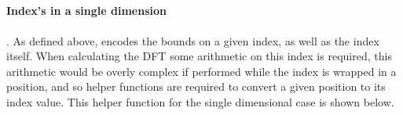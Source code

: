 \begin{code}[hide]
\AgdaSymbol{;}\AgdaSpace{}%
\AgdaSymbol{;}\AgdaSpace{}%
\AgdaSymbol{;}\AgdaSpace{}%
\AgdaSymbol{)}\<%
\\
%
\>[2]\AgdaSpace{}%
\AgdaSpace{}%
\AgdaSpace{}%
\AgdaSpace{}%
\AgdaSymbol{(}\AgdaSymbol{;}\AgdaSpace{}%
\AgdaSymbol{;}\AgdaSpace{}%
\AgdaSymbol{;}\AgdaSpace{}%
\AgdaSymbol{;}\AgdaSpace{}%
\AgdaSymbol{;}\AgdaSpace{}%
\AgdaSymbol{)}\<%
\\
%
\\[\AgdaEmptyExtraSkip]%
%
\>[2]\<%
\\
\>[2][@{}l@{\AgdaIndent{0}}]%
\>[4]\<%
\\
\>[4][@{}l@{\AgdaIndent{0}}]%
\>[6]\AgdaSpace{}%
\AgdaSymbol{:}\AgdaSpace{}%
\<%
\\
%
\>[6]\AgdaSpace{}%
\AgdaSpace{}%
\AgdaSymbol{:}\AgdaSpace{}%
\<%
\\
%
\\[\AgdaEmptyExtraSkip]%
%
\>[2]\AgdaSpace{}%
\AgdaSymbol{:}\AgdaSpace{}%
\AgdaSpace{}%
\AgdaSpace{}%
\AgdaSpace{}%
\AgdaSpace{}%
\<%
\\
%
\>[2]\AgdaSpace{}%
\AgdaSymbol{=}\AgdaSpace{}%
\<%
\\
%
\\[\AgdaEmptyExtraSkip]%
%
\>[2]\AgdaComment{------------------------------------}\<%
\\
%
\>[2]\<%
\\
%
\>[2]\AgdaComment{------------------------------------}\<%
\end{code}

\paragraph{Index's in a single dimension}. As defined above,  encodes 
the bounds on a given index, as well as the index itself. 
When calculating the DFT some arithmetic on this index is required,
this arithmetic would be overly complex if performed while the index is 
wrapped in a position, and so
helper functions are required to convert a given position to its index value.
This helper function for the single dimensional case is shown below.

